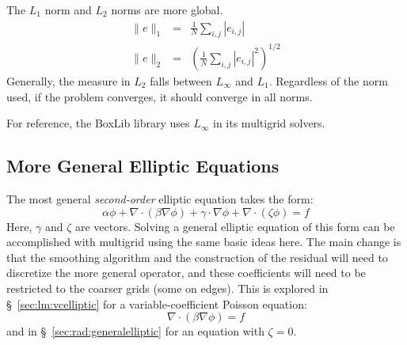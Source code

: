 The $L_1$ norm and $L_2$ norms are more global. 
\begin{eqnarray}
\|e\|_1 &=& \frac{1}{N} \sum_{i,j} |e_{i,j} | \\
\|e\|_2 &=& \left ( \frac{1}{N} \sum_{i,j} |e_{i,j} |^2 \right )^{1/2}
\end{eqnarray}
Generally, the measure in $L_2$ falls between $L_\infty$ and $L_1$.
Regardless of the norm used, if the problem converges, it should
converge in all norms.

For reference, the BoxLib library uses $L_\infty$ in its multigrid solvers.



\subsection{More General Elliptic Equations}

The most general {\em second-order} elliptic equation takes the form:
\begin{equation}
  \alpha \phi + \nabla \cdot (\beta \nabla \phi) +
  \gamma \cdot \nabla \phi + \nabla \cdot (\zeta \phi) = f
\end{equation}
Here, $\gamma$ and $\zeta$ are vectors.  Solving a general elliptic
equation of this form can be accomplished with multigrid using the
same basic ideas here.  The main change is that the smoothing
algorithm and the construction of the residual will need to discretize
the more general operator, and these coefficients will need to
be restricted to the coarser grids (some on edges).  This is explored in
\S~\ref{sec:lm:vcelliptic} for a variable-coefficient Poisson equation:
 \begin{equation}
 \nabla \cdot (\beta \nabla \phi) = f
 \end{equation}
and in \S~\ref{sec:rad:generalelliptic} for an equation with $\zeta = 0$.



